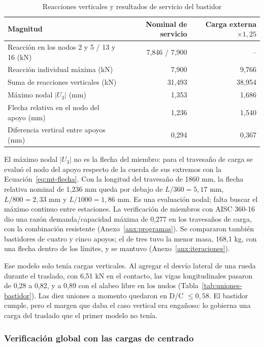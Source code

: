 \begin{table}[htbp]
\centering\small\singlespacing
\caption{Reacciones verticales y resultados de servicio del bastidor}
\label{tab:reacciones-r01}
\begin{tabularx}{\textwidth}{@{}Yrr@{}}
\toprule
\textbf{Magnitud} & \textbf{Nominal de servicio} & \textbf{Carga externa $\times1{,}25$} \\
\midrule
Reacción en los nodos 2 y 5 / 13 y 16 (kN) & 7,846 / 7,900 & -- \\
Reacción individual máxima (kN) & 7,900 & 9,766 \\
Suma de reacciones verticales (kN) & 31,493 & 38,954 \\
Máximo nodal $|U_3|$ (mm) & 1,353 & 1,686 \\
Flecha relativa en el nodo del apoyo (mm) & 1,236 & 1,540 \\
Diferencia vertical entre apoyos (mm) & 0,294 & 0,367 \\
\bottomrule
\end{tabularx}
\end{table}
\label{tab:resultados-servicio}

El máximo nodal $|U_3|$ no es la flecha del miembro: para el travesaño de carga se evaluó el nodo del apoyo respecto de la cuerda de sus extremos con la Ecuación~\eqref{eq:mt-flecha}. Con la longitud del travesaño de 1860 mm, la flecha relativa nominal de 1,236 mm queda por debajo de $L/360=5{,}17$ mm, $L/800=2{,}33$ mm y $L/1000=1{,}86$ mm. Es una evaluación nodal; falta buscar el máximo continuo entre estaciones. La verificación de miembros con AISC 360-16 dio una razón demanda/capacidad máxima de 0,277 en los travesaños de carga, con la combinación resistente (Anexo~\ref{anx:programas}). Se compararon también bastidores de cuatro y cinco apoyos; el de tres tuvo la menor masa, 168,1 kg, con una flecha dentro de los límites, y se mantuvo (Anexo~\ref{anx:iteraciones}).

Ese modelo solo tenía cargas verticales. Al agregar el desvío lateral de una rueda durante el traslado, con 6,51 kN en el contacto, las vigas longitudinales pasaron de 0,28 a 0,82, y a 0,89 con el alabeo libre en los nudos (Tabla~\ref{tab:uniones-bastidor}). Las diez uniones a momento quedaron en D/C $\leq0{,}58$. El bastidor cumple, pero el margen que daba el caso vertical era engañoso: lo gobierna una carga del traslado que el primer modelo no tenía.

\subsubsection{Verificación global con las cargas de centrado}

